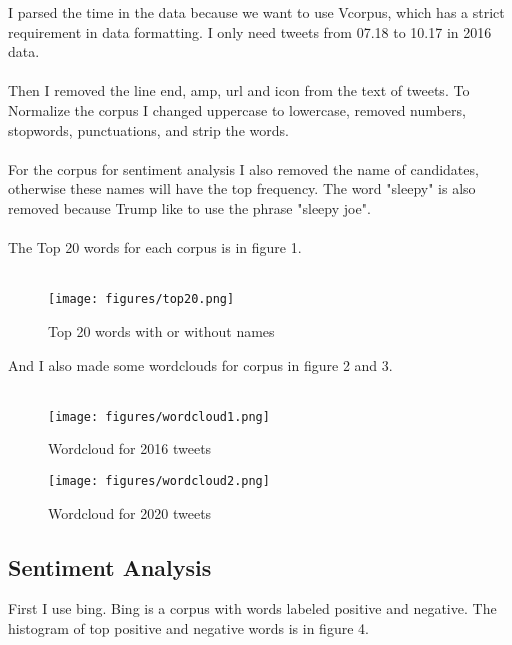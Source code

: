 \documentclass{article}
\begin{document}
I parsed the time in the data because we want to use Vcorpus, which has a strict requirement in data formatting. I only need tweets from 07.18 to 10.17 in 2016 data.
\\ \hspace*{\fill} \\
Then I removed the line end, amp, url and icon from the text of tweets. To Normalize the corpus I changed uppercase to lowercase, removed numbers, stopwords, punctuations, and strip the words.
\\ \hspace*{\fill} \\
For the corpus for sentiment analysis I also removed the name of candidates, otherwise these names will have the top frequency. The word "sleepy" is also removed because Trump like to use the phrase "sleepy joe".
\\ \hspace*{\fill} \\
The Top 20 words for each corpus is in figure 1.\\ \hspace*{\fill} \\

\begin{figure}[h]
    \centering
    \texttt{[image: figures/top20.png]}
    \caption{Top 20 words with or without names}
    \label{top20}
\end{figure}

And I also made some wordclouds for corpus in figure 2 and 3.\\ \hspace*{\fill} \\

\begin{figure}[h]
    \centering
    \texttt{[image: figures/wordcloud1.png]}
    \caption{Wordcloud for 2016 tweets}
    \label{wordcloud1}
\end{figure}

\begin{figure}[h]
    \centering
    \texttt{[image: figures/wordcloud2.png]}
    \caption{Wordcloud for 2020 tweets}
    \label{wordcloud2}
\end{figure}

\subsection{Sentiment Analysis}

First I use bing. Bing is a corpus with words labeled positive and negative. The histogram of top positive and negative words is in figure 4.\\ \hspace*{\fill} \\
\end{document}
